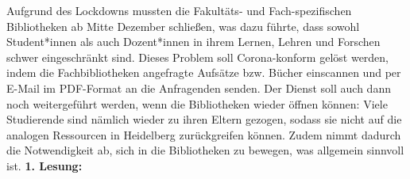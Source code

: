 {    }{
        Aufgrund des Lockdowns mussten die Fakultäts- und Fach-spezifischen Bibliotheken ab
        Mitte Dezember schließen, was dazu führte, dass sowohl Student*innen als auch
        Dozent*innen in ihrem Lernen, Lehren und Forschen schwer eingeschränkt sind. Dieses
        Problem soll Corona-konform gelöst werden, indem die Fachbibliotheken angefragte
        Aufsätze bzw. Bücher einscannen und per E-Mail im PDF-Format an die Anfragenden
        senden. Der Dienst soll auch dann noch weitergeführt werden, wenn die Bibliotheken
        wieder öffnen können: Viele Studierende sind nämlich wieder zu ihren Eltern gezogen,
        sodass sie nicht auf die analogen Ressourcen in Heidelberg zurückgreifen können.
        Zudem nimmt dadurch die Notwendigkeit ab, sich in die Bibliotheken zu bewegen, was
        allgemein sinnvoll ist.
    }{
        \textbf{1. Lesung:}
        \ul{}
    }{
    }
